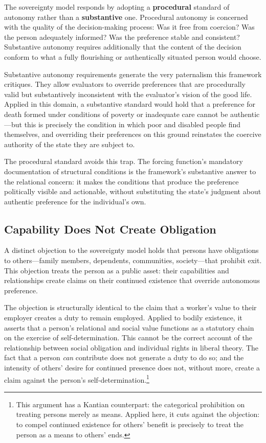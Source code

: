 \documentclass[11pt, letterpaper]{article}
\begin{document}
The sovereignty model responds by adopting a \textbf{procedural} standard of autonomy
rather than a \textbf{substantive} one. Procedural autonomy is concerned with the
quality of the decision-making process: Was it free from coercion? Was the person
adequately informed? Was the preference stable and consistent? Substantive autonomy
requires additionally that the content of the decision conform to what a fully flourishing
or authentically situated person would choose.

Substantive autonomy requirements generate the very paternalism this framework critiques.
They allow evaluators to override preferences that are procedurally valid but substantively
inconsistent with the evaluator's vision of the good life. Applied in this domain, a
substantive standard would hold that a preference for death formed under conditions of
poverty or inadequate care cannot be authentic---but this is precisely the condition in
which poor and disabled people find themselves, and overriding their preferences on this
ground reinstates the coercive authority of the state they are subject to.

The procedural standard avoids this trap. The forcing function's mandatory documentation
of structural conditions is the framework's substantive answer to the relational concern:
it makes the conditions that produce the preference politically visible and actionable,
without substituting the state's judgment about authentic preference for the individual's
own.

\subsection{Capability Does Not Create Obligation}

A distinct objection to the sovereignty model holds that persons have obligations to
others---family members, dependents, communities, society---that prohibit exit. This
objection treats the person as a public asset: their capabilities and relationships
create claims on their continued existence that override autonomous preference.

The objection is structurally identical to the claim that a worker's value to their
employer creates a duty to remain employed. Applied to bodily existence, it asserts
that a person's relational and social value functions as a statutory chain on the
exercise of self-determination. This cannot be the correct account of the relationship
between social obligation and individual rights in liberal theory. The fact that a
person \textit{can} contribute does not generate a duty to do so; and the intensity
of others' desire for continued presence does not, without more, create a claim against
the person's self-determination.\footnote{%
  This argument has a Kantian counterpart: the categorical prohibition on treating
  persons merely as means. Applied here, it cuts against the objection: to compel
  continued existence for others' benefit is precisely to treat the person as a means
  to others' ends.}
\end{document}
